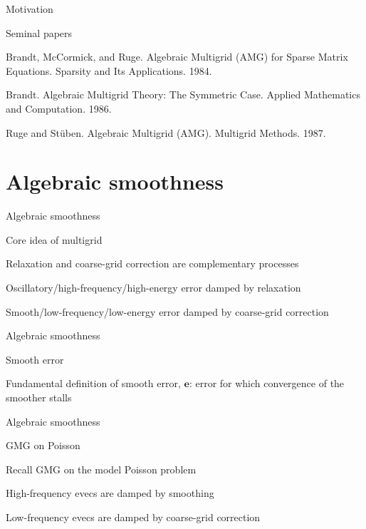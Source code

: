 \documentclass[18pt,xcolor=table]{beamer}
\begin{document}
\begin{frame}{Motivation}
\begin{block}{Seminal papers}
\bit
\item Brandt, McCormick, and Ruge. Algebraic Multigrid (AMG) for Sparse Matrix Equations. Sparsity and Its Applications. 1984.
\item Brandt. Algebraic Multigrid Theory: The Symmetric Case. Applied Mathematics and Computation. 1986.
\item Ruge and St\"uben. Algebraic Multigrid (AMG). Multigrid Methods. 1987.
\eit
\end{block}
\end{frame}


\section{Algebraic smoothness}

\begin{frame}{Algebraic smoothness}
\begin{block}{Core idea of multigrid}
\bit
\item Relaxation and coarse-grid correction are complementary processes
\item Oscillatory/high-frequency/high-energy error damped by relaxation
\item Smooth/low-frequency/low-energy error damped by coarse-grid correction
\eit
\end{block}
\end{frame}

\begin{frame}{Algebraic smoothness}
\begin{block}{Smooth error}
\bit
\item Fundamental definition of smooth error, $\mathbf{e}$: error for which convergence of the smoother stalls
\eit
\end{block}
\end{frame}

\begin{frame}{Algebraic smoothness}
\begin{block}{GMG on Poisson}
\bit
\item Recall GMG on the model Poisson problem
\item High-frequency evecs are damped by smoothing
\item Low-frequency evecs are damped by coarse-grid correction
\eit
\end{block}
\end{frame}
\end{document}
